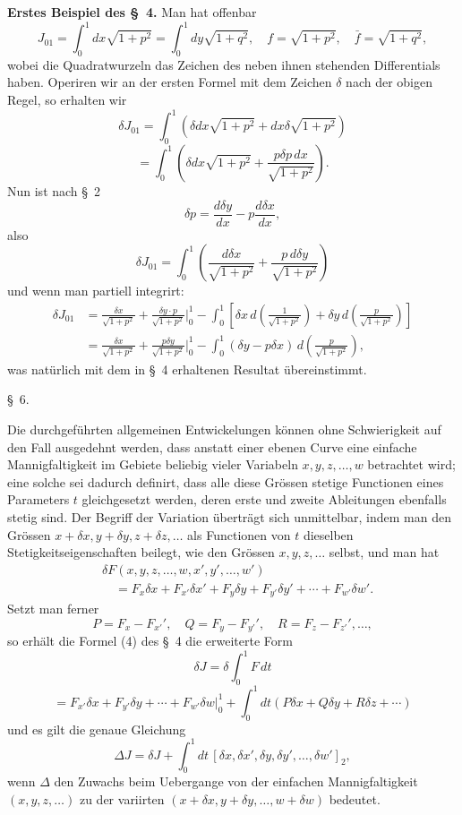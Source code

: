 \documentclass[11pt,a4paper,leqno]{article}
\begin{document}
\medskip
\noindent\textbf{Erstes Beispiel des \S~4.} Man hat offenbar
\[
J_{01}=\int_0^1dx\sqrt{1+p^2}=\int_0^1dy\sqrt{1+q^2},\quad f=\sqrt{1+p^2},\quad \bar f=\sqrt{1+q^2},
\]
wobei die Quadratwurzeln das Zeichen des neben ihnen stehenden Differentials haben. Operiren wir an der ersten Formel mit dem Zeichen \(\delta\) nach der obigen Regel, so erhalten wir
\[
\delta J_{01}=\int_0^1\left(\delta dx\sqrt{1+p^2}+dx\delta\sqrt{1+p^2}\right)
\]
\[
=\int_0^1\left(\delta dx\sqrt{1+p^2}+\frac{p\delta p\,dx}{\sqrt{1+p^2}}\right).
\]
Nun ist nach \S~2
\[
\delta p=\frac{d\delta y}{dx}-p\frac{d\delta x}{dx},
\]
also
\[
\delta J_{01}=\int_0^1\left(\frac{d\delta x}{\sqrt{1+p^2}}+\frac{p\,d\delta y}{\sqrt{1+p^2}}\right)
\]
und wenn man partiell integrirt:
\[
\begin{aligned}
\delta J_{01}
&=\frac{\delta x}{\sqrt{1+p^2}}+\frac{\delta y\cdot p}{\sqrt{1+p^2}}\bigg|_0^1
-\int_0^1\left[\delta x\,d\left(\frac{1}{\sqrt{1+p^2}}\right)+\delta y\,d\left(\frac{p}{\sqrt{1+p^2}}\right)\right]\\
&=\frac{\delta x}{\sqrt{1+p^2}}+\frac{p\delta y}{\sqrt{1+p^2}}\bigg|_0^1
-\int_0^1(\delta y-p\delta x)\,d\left(\frac{p}{\sqrt{1+p^2}}\right),
\end{aligned}
\]
was natürlich mit dem in \S~4 erhaltenen Resultat übereinstimmt.

\begin{center}
\S~6.
\end{center}

Die durchgeführten allgemeinen Entwickelungen können ohne Schwierigkeit auf den Fall ausgedehnt werden, dass anstatt einer ebenen Curve eine einfache Mannigfaltigkeit im Gebiete beliebig vieler Variabeln \(x,y,z,\ldots,w\) betrachtet wird; eine solche sei dadurch definirt, dass alle diese Grössen stetige Functionen eines Parameters \(t\) gleichgesetzt werden, deren erste und zweite Ableitungen ebenfalls stetig sind. Der Begriff der Variation überträgt sich unmittelbar, indem man den Grössen \(x+\delta x,y+\delta y,z+\delta z,\ldots\) als Functionen von \(t\) dieselben Stetigkeitseigenschaften beilegt, wie den Grössen \(x,y,z,\ldots\) selbst, und man hat
\[
\begin{aligned}
&\delta F(x,y,z,\ldots,w,x',y',\ldots,w')\\
&\quad=F_x\delta x+F_{x'}\delta x'+F_y\delta y+F_{y'}\delta y'+\cdots+F_{w'}\delta w'.
\end{aligned}
\]
Setzt man ferner
\[
P=F_x-F_{x'}',\quad Q=F_y-F_{y'}',\quad R=F_z-F_{z'}',\ldots,
\]
so erhält die Formel (4) des \S~4 die erweiterte Form
\[
\delta J=\delta\int_0^1F\,dt
\]
\[
=F_{x'}\delta x+F_{y'}\delta y+\cdots+F_{w'}\delta w\bigg|_0^1+\int_0^1dt(P\delta x+Q\delta y+R\delta z+\cdots)
\]
und es gilt die genaue Gleichung
\[
\Delta J=\delta J+\int_0^1dt\,[\delta x,\delta x',\delta y,\delta y',\ldots,\delta w']_2,
\]
wenn \(\Delta\) den Zuwachs beim Uebergange von der einfachen Mannigfaltigkeit \((x,y,z,\ldots)\) zu der variirten \((x+\delta x,y+\delta y,\ldots,w+\delta w)\) bedeutet.
\end{document}
